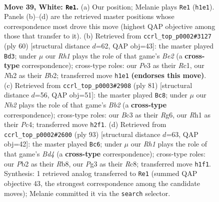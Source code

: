 \documentclass[11pt]{article}
\begin{document}
\clearpage

\begin{figure}[p]\centering
\begin{subfigure}{0.46\textwidth}\centering
\resizebox{\linewidth}{!}{%
\newchessgame
\chessboard[
  setfen={1k5r/rp2b1p1/p1p4p/P2b1p2/R1p4P/2B1P1P1/1P3P1N/2K4R w - - 0 39},
  showmover=false,
  pgfstyle=straightmove, color=movearrow, markmove={h1-e1}
]}
\caption{}
\end{subfigure}\hfill
\begin{subfigure}{0.46\textwidth}\centering
\resizebox{\linewidth}{!}{%
\newchessgame
\chessboard[
  setfen={4r1k1/2p2pp1/1r1b4/3p3p/1p1P1PbP/1P2P3/PB1RBP2/2R3K1 w - - 0 31},
  showmover=false,
  pgfstyle=straightmove, color=movearrow, markmove={e2-d3}
]}
\caption{}
\end{subfigure}
\\[4pt]
\begin{subfigure}{0.46\textwidth}\centering
\resizebox{\linewidth}{!}{%
\newchessgame
\chessboard[
  setfen={r4k2/1b3p2/1p4r1/1B1p3p/P1pPp2P/2R1P3/PR3PP1/6K1 b - - 2 41},
  showmover=false,
  pgfstyle=straightmove, color=movearrow, markmove={b7-c8}
]}
\caption{}
\end{subfigure}\hfill
\begin{subfigure}{0.46\textwidth}\centering
\resizebox{\linewidth}{!}{%
\newchessgame
\chessboard[
  setfen={1rr5/4k3/1b2p1p1/p2b1p1p/2p4P/P1B1PPP1/1P1R1K2/3B2R1 b - - 1 47},
  showmover=false,
  pgfstyle=straightmove, color=movearrow, markmove={d5-c6}
]}
\caption{}
\end{subfigure}
\caption{\textbf{Move 39, White: \texttt{Re1}.} (a) Our position; Melanie plays \texttt{Re1} (\texttt{h1e1}). Panels (b)--(d) are the retrieved master positions whose correspondence most drove this move (highest QAP objective among those that transfer to it). (b) Retrieved from \texttt{ccrl\_top\_p0002\#3127} (ply 60) [structural distance $d$=62, QAP obj=43]: the master played \texttt{Bd3}; under $\mu$ our \emph{Rh1} plays the role of that game's \emph{Be2} (a \textbf{cross-type} correspondence); cross-type roles: our \emph{P}e3 as their \emph{R}c1, our \emph{N}h2 as their \emph{B}b2; transferred move \texttt{h1e1} \textbf{(endorses this move)}. (c) Retrieved from \texttt{ccrl\_top\_p0003\#2908} (ply 81) [structural distance $d$=56, QAP obj=51]: the master played \texttt{Bc8}; under $\mu$ our \emph{Nh2} plays the role of that game's \emph{Bb2} (a \textbf{cross-type} correspondence); cross-type roles: our \emph{B}c3 as their \emph{R}g6, our \emph{R}h1 as their \emph{P}c4; transferred move \texttt{h2f1}. (d) Retrieved from \texttt{ccrl\_top\_p0002\#2600} (ply 93) [structural distance $d$=63, QAP obj=42]: the master played \texttt{Bc6}; under $\mu$ our \emph{Rh1} plays the role of that game's \emph{Bd4} (a \textbf{cross-type} correspondence); cross-type roles: our \emph{P}b2 as their \emph{R}b8, our \emph{P}g3 as their \emph{R}c8; transferred move \texttt{h1f1}. Synthesis: 1 retrieved analog transferred to \texttt{Re1} (summed QAP objective 43, the strongest correspondence among the candidate moves); Melanie committed it via the \texttt{search} selector.}
\label{fig:thought-m76}
\end{figure}
\end{document}
